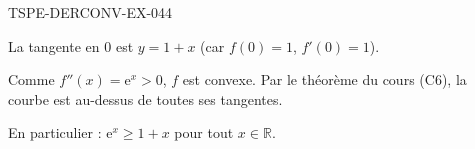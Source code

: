 \begin{corrige}{TSPE-DERCONV-EX-044}

La tangente en $0$ est $y = 1 + x$ (car $f(0)=1$, $f'(0)=1$).


Comme $f''(x) = \mathrm{e}^x > 0$, $f$ est convexe. Par le théorème du cours (C6), la courbe est au-dessus de toutes ses tangentes.

En particulier : $\mathrm{e}^x \geq 1 + x$ pour tout $x \in \mathbb{R}$.

\end{corrige}
